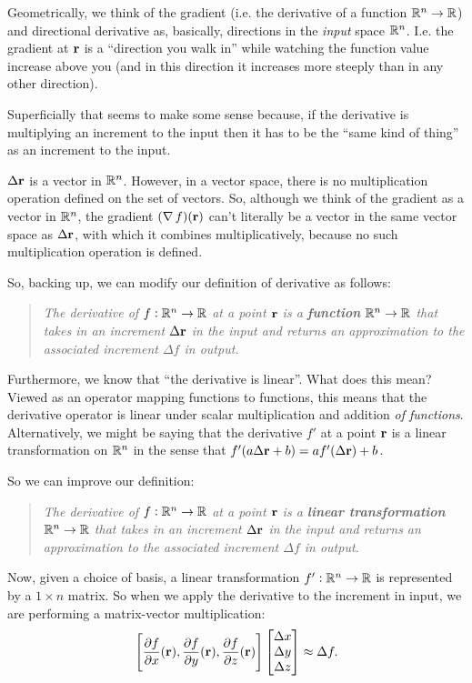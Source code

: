 Geometrically, we think of the gradient (i.e. the derivative of a function $\mathbb{R}^n \to \mathbb{R}$) and
directional derivative as, basically, directions in the \emph{input} space $\mathbb{R}^n$. I.e. the gradient
at $\mathbf{r}$ is a ``direction you walk in'' while watching the function value increase above you (and in
this direction it increases more steeply than in any other direction).

Superficially that seems to make some sense because, if the derivative is multiplying an increment
to the input then it has to be the ``same kind of thing'' as an increment to the input.

$\Delta \mathbf{r}$ is a vector in $\mathbb{R}^n$. However, in a vector space, there is no multiplication operation defined
on the set of vectors. So, although we think of the gradient as a vector in $\mathbb{R}^n$, the gradient
$(\operatorname{\nabla} f)(\mathbf{r})$ can't literally be a vector in the same vector space as $\Delta \mathbf{r}$, with which it combines
multiplicatively, because no such multiplication operation is defined.

So, backing up, we can modify our definition of derivative as follows:
\begin{quote}
  \emph{
    The derivative of $f:\mathbb{R}^n \to \mathbb{R}$ at a point $\mathbf{r}$ is a \textbf{function} $\mathbb{R}^n \to \mathbb{R}$ that takes in an increment
    $\Delta \mathbf{r}$ in the input and returns an approximation to the associated increment $\Delta f$ in output.
  }
\end{quote}

Furthermore, we know that ``the derivative is linear''. What does this mean? Viewed as an operator
mapping functions to functions, this means that the derivative operator is linear under scalar
multiplication and addition \emph{of functions}. Alternatively, we might be saying that the
derivative $f'$ at a point $\mathbf{r}$ is a linear transformation on $\mathbb{R}^n$ in the sense that
$f'(a\Delta \mathbf{r} + b) = af'(\Delta\mathbf{r}) + b$.

So we can improve our definition:
\begin{quote}
  \emph{
    The derivative of $f:\mathbb{R}^n \to \mathbb{R}$ at a point $\mathbf{r}$ is a \textbf{linear transformation}
    $\mathbb{R}^n \to \mathbb{R}$ that takes in an increment $\Delta \mathbf{r}$ in the input and returns an approximation to the
    associated increment $\Delta f$ in output.
  }
\end{quote}

Now, given a choice of basis, a linear transformation $f':\mathbb{R}^n \to \mathbb{R}$ is represented by a
$1 \times n$ matrix. So when we apply the derivative to the increment in input, we are performing a
matrix-vector multiplication:
\begin{align*}
  \Bigg[\frac{\partial f}{\partial x}(\mathbf{r}), \frac{\partial f}{\partial y}(\mathbf{r}), \frac{\partial f}{\partial z}(\mathbf{r})\Bigg] \begin{bmatrix}\Delta x\\\Delta y\\\Delta z\end{bmatrix} \approx \Delta f.
\end{align*}

